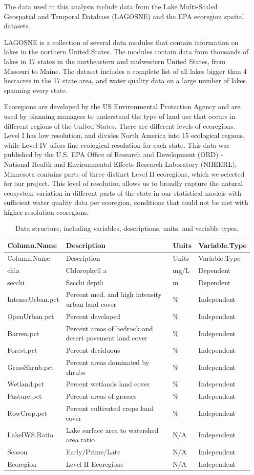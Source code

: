 \documentclass[12pt,]{article}
\begin{document}
The data used in this analysis include data from the Lake Multi-Scaled
Geospatial and Temporal Database (LAGOSNE) and the EPA ecoregion spatial
datasets.

LAGOSNE is a collection of several data modules that contain information
on lakes in the northern United States. The modules contain data from
thousands of lakes in 17 states in the northeastern and midwestern
United States, from Missouri to Maine. The dataset includes a complete
list of all lakes bigger than 4 hectacres in the 17 state area, and
water quality data on a large number of lakes, spanning every state.

Ecoregions are developed by the US Environmental Protection Agency and
are used by planning managers to understand the type of land use that
occurs in different regions of the United States. There are different
levels of ecoregions. Level I has low resolution, and divides North
America into 15 ecological regions, while Level IV offers fine
ecological resolution for each state. This data was published by the
U.S. EPA Office of Research and Development (ORD) - National Health and
Environmental Effects Research Laboratory (NHEERL). Minnesota contains
parts of three distinct Level II ecoregions, which we selected for our
project. This level of resolution allows us to broadly capture the
natural ecosystem variation in different parts of the state in our
statistical models with sufficient water quality data per ecoregion,
conditions that could not be met with higher resolution ecoregions.

\begin{longtable}[]{@{}llll@{}}
\caption{Data structure, including variables, descriptions, units, and
variable types.}\tabularnewline
\toprule
Column.Name & Description & Units & Variable.Type\tabularnewline
\midrule
\endfirsthead
\toprule
Column.Name & Description & Units & Variable.Type\tabularnewline
\midrule
\endhead
chla & Chlorophyll a & mg/L & Dependent\tabularnewline
secchi & Secchi depth & m & Dependent\tabularnewline
IntenseUrban.pct & Percent med. and high intensity urban land cover & \%
& Independent\tabularnewline
OpenUrban.pct & Percent developed & \% & Independent\tabularnewline
Barren.pct & Percent areas of bedrock and desert pavement land cover &
\% & Independent\tabularnewline
Forest.pct & Percent deciduous & \% & Independent\tabularnewline
GrassShrub.pct & Percent areas dominated by shrubs & \% &
Independent\tabularnewline
Wetland.pct & Percent wetlands land cover & \% &
Independent\tabularnewline
Pasture.pct & Percent areas of grasses & \% & Independent\tabularnewline
RowCrop.pct & Percent cultivated crops land cover & \% &
Independent\tabularnewline
LakeIWS.Ratio & Lake surface area to watershed area ratio & N/A &
Independent\tabularnewline
Season & Early/Prime/Late & N/A & Independent\tabularnewline
Ecoregion & Level II Ecoregions & N/A & Independent\tabularnewline
\bottomrule
\end{longtable}
\end{document}
